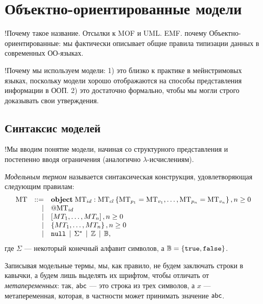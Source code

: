 \chapter{Объектно-ориентированные модели}

!Почему такое название. Отсылки к MOF и UML. EMF. 
почему Объектно-ориентированные: мы фактически описывает общие правила типизации данных в современных ОО-языках.

!Почему мы используем модели: 
1) это близко к практике в мейнстримовых языках, поскольку модели хорошо отображаются на способы представления информации в ООП. 
2) это достаточно формально, чтобы мы могли строго доказывать свои утверждения.

\section{Синтаксис моделей}

!Мы вводим понятие модели, начиная со структурного представления и постепенно вводя ограничения (аналогично $\lambda$-исчислениям).

\begin{Def}
\emph{Модельным термом} называется синтаксическая конструкция, удовлетворяющая следующим правилам:
\[
\begin{array}{rrl}
	\mbox{MT} & ::= & \mathbf{object}\;\mbox{MT}_{id} : \mbox{MT}_{cl}\left\{ \mbox{MT}_{p_1}=\mbox{MT}_{v_1},\ldots,\mbox{MT}_{p_n}=\mbox{MT}_{v_n} \right\}, n \ge 0 \\ 
	           &   | & @\mbox{MT}_{id} \\ 
	           &   | & \left[MT_1,\ldots,MT_n\right], n \ge 0 \\ 
	           &   | & \left\{MT_1,\ldots,MT_n\right\}, n \ge 0 \\ 
	           &   | & \mathtt{null} \;\,|\;\, \Sigma^* \;\,|\;\, \mathbb{Z} \;\,|\;\, \mathbb{B}, \\
\end{array}
\]
где $\Sigma$ --- некоторый конечный алфавит символов, а $\mathbb{B} = \left\{ \mathtt{true}, \mathtt{false} \right\}$.
\end{Def}

Записывая модельные термы, мы, как правило, не будем заключать строки в кавычки, а будем лишь выделять их шрифтом, чтобы отличать от \emph{метапеременных}: так, $\mathsf{abc}$ --- это строка из трех символов, а $x$ --- метапеременная, которая, в частности может принимать значение $\mathsf{abc}$.

